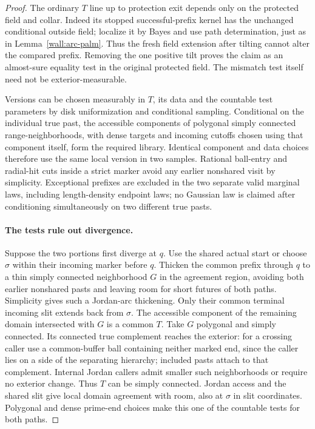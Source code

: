 \begin{proof}
The ordinary $T$ line up to protection exit depends only on the protected field and collar.  Indeed its stopped successful-prefix kernel has the unchanged conditional outside field; localize it by Bayes and use path determination, just as in Lemma~\ref{wall:arc-palm}.  Thus the fresh field extension after tilting cannot alter the compared prefix.  Removing the one positive tilt proves the claim as an almost-sure equality test in the original protected field.  The mismatch test itself need not be exterior-measurable.

Versions can be chosen measurably in $T$, its data and the countable test parameters by disk uniformization and conditional sampling.  Conditional on the individual true past, the accessible components of polygonal simply connected range-neighborhoods, with dense targets and incoming cutoffs chosen using that component itself, form the required library.  Identical component and data choices therefore use the same local version in two samples.  Rational ball-entry and radial-hit cuts inside a strict marker avoid any earlier nonshared visit by simplicity.  Exceptional prefixes are excluded in the two separate valid marginal laws, including length-density endpoint laws; no Gaussian law is claimed after conditioning simultaneously on two different true pasts.

\paragraph{The tests rule out divergence.}
Suppose the two portions first diverge at $q$.  Use the shared actual start or choose $\sigma$ within their incoming marker before $q$.  Thicken the common prefix through $q$ to a thin simply connected neighborhood $G$ in the agreement region, avoiding both earlier nonshared pasts and leaving room for short futures of both paths.  Simplicity gives such a Jordan-arc thickening.  Only their common terminal incoming slit extends back from $\sigma$.  The accessible component of the remaining domain intersected with $G$ is a common $T$.  Take $G$ polygonal and simply connected.  Its connected true complement reaches the exterior: for a crossing caller use a common-buffer ball containing neither marked end, since the caller lies on a side of the separating hierarchy; included pasts attach to that complement.  Internal Jordan callers admit smaller such neighborhoods or require no exterior change.  Thus $T$ can be simply connected.  Jordan access and the shared slit give local domain agreement with room, also at $\sigma$ in slit coordinates.  Polygonal and dense prime-end choices make this one of the countable tests for both paths.


\end{proof}
